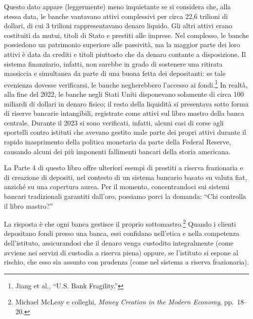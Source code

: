 \documentclass[
  a5paper,
  smalldemyvopaper,10pt,twoside,onecolumn,openright,extrafontsizes,hidelinks]{memoir}
\begin{document}
Questo dato appare (leggermente) meno inquietante se si considera che,
alla stessa data, le banche vantavano attivi complessivi per circa 22,6
trilioni di dollari, di cui 3 trilioni rappresentavano denaro liquido.
Gli altri attivi erano costituiti da mutui, titoli di Stato e prestiti
alle imprese. Nel complesso, le banche possiedono un patrimonio
superiore alle passività, ma la maggior parte dei loro attivi è data da
crediti e titoli piuttosto che da denaro contante a disposizione. Il
sistema finanziario, infatti, non sarebbe in grado di sostenere una
ritirata massiccia e simultanea da parte di una buona fetta dei
depositanti: se tale evenienza dovesse verificarsi, le banche
negherebbero l'accesso ai fondi.\footnote{Jiang et al., ``U.S. Bank
  Fragility.''} In realtà, alla fine del 2022, le banche negli Stati
Uniti disponevano solamente di circa 100 miliardi di dollari in denaro
fisico; il resto della liquidità si presentava sotto forma di riserve
bancarie intangibili, registrate come attivi sul libro mastro della
banca centrale. Durante il 2023 si sono verificati, infatti, alcuni casi
di corse agli sportelli contro istituti che avevano gestito male parte
dei propri attivi durante il rapido inasprimento della politica
monetaria da parte della Federal Reserve, causando alcuni dei più
imponenti fallimenti bancari della storia americana.

La Parte 4 di questo libro offre ulteriori esempi di prestiti a riserva
frazionaria e di creazione di depositi, nel contesto di un sistema
bancario basato su valuta fiat, anziché su una copertura aurea. Per il
momento, concentrandoci sui sistemi bancari tradizionali garantiti
dall'oro, possiamo porci la domanda: ``Chi controlla il libro mastro?''

La risposta è che ogni banca gestisce il proprio sottomastro.\footnote{Michael
  McLeay e colleghi, \emph{Money Creation in the Modern Economy},
  pp.~18--20.} Quando i clienti depositano fondi presso una banca, essi
confidano nell'etica e nella competenza dell'istituto, assicurandosi che
il denaro venga custodito integralmente (come avviene nei servizi di
custodia a riserva piena) oppure, se l'istituto si espone al rischio,
che esso sia assunto con prudenza (come nel sistema a riserva
frazionaria).
\end{document}
